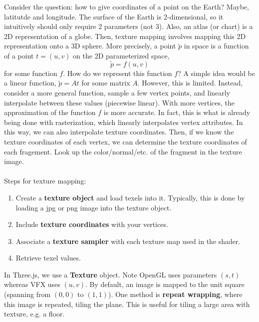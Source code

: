\documentclass[letterpaper,12pt]{article}
\begin{document}
Consider the question: how to give coordinates of a point on the Earth? Maybe, latitutde and longitude. The surface of the Earth is 2-dimensional, so it intuitively should only require 2 parameters (not 3). Also, an atlas (or chart) is a 2D representation of a globe. Then, texture mapping involves mapping this 2D representation onto a 3D sphere. More precisely, a point $\tilde{p}$ in space is a function of a point $t = (u,v)$ on the 2D parameterized space,
\begin{equation*}
    \tilde{p} = f(u,v)
\end{equation*}
for some function $f$. How do we represent this function $f$? A simple idea would be a linear function, $\tilde{p} = At$ for some matrix $A$. However, this is limited. Instead, consider a more general function, sample a few vertex points, and linearly interpolate between these values (piecewise linear). With more vertices, the approximation of the function $f$ is more accurate. In fact, this is what is already being done with rasterization, which linearly interpolates vertex attributes. In this way, we can also interpolate texture coordinates. Then, if we know the texture coordinates of each vertex, we can determine the texture coordinates of each fragement. Look up the color/normal/etc. of the fragment in the texture image.
\\ \\ Steps for texture mapping:
\begin{enumerate}
    \item Create a \textbf{texture object} and load texels into it. Typically, this is done by loading a jpg or png image into the texture object.
    \item Include \textbf{texture coordinates} with your vertices.
    \item Associate a \textbf{texture sampler} with each texture map used in the shader.
    \item Retrieve texel values.
\end{enumerate}
In Three.js, we use a \textbf{Texture} object. Note OpenGL uses parameters $(s,t)$ whereas VFX uses $(u,v)$. By default, an image is mapped to the unit square (spanning from $(0,0)$ to $(1,1)$). One method is \textbf{repeat wrapping}, where this image is repeated, tiling the plane. This is useful for tiling a large area with texture, e.g. a floor.
\end{document}
